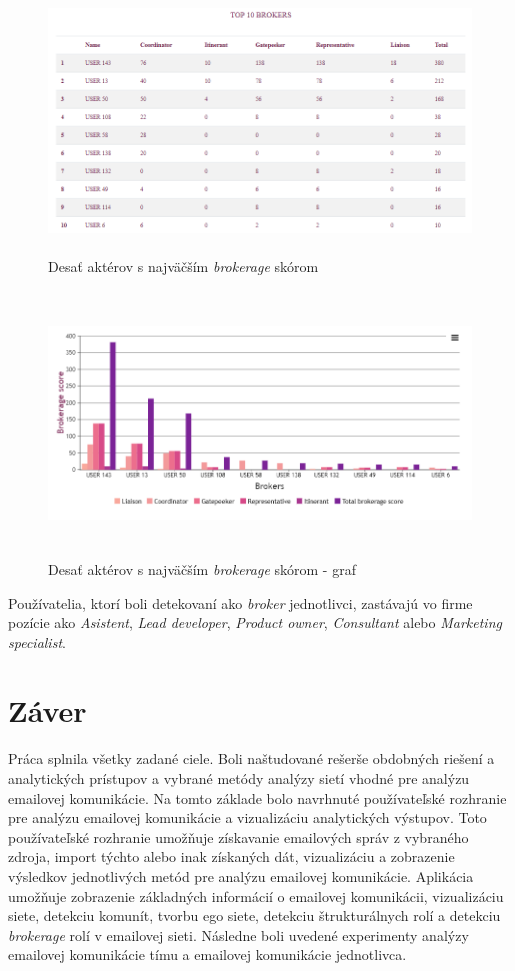 \documentclass[slovak,master,public,dept460,male,cpdeclaration,oneside]{diploma}
\begin{document}
\begin{figure}[H]
\centering
\includegraphics[width=12cm, height=7cm]{figures/analyza_jednotlivca_brokerage}
\caption{Desať aktérov s najväčším \textit{brokerage} skórom}
\label{analyza_jednotlivca_brokerage}
\end{figure}


\begin{figure}[H]
\centering
\includegraphics[width=13cm, height=7cm]{figures/analyza_jednotlivca_brokerage_graph}
\caption{Desať aktérov s najväčším \textit{brokerage} skórom - graf}
\label{analyza_jednotlivca_brokerage_graph}
\end{figure}

Používatelia, ktorí boli detekovaní ako \textit{broker} jednotlivci, zastávajú vo firme pozície ako \textit{Asistent}, \textit{Lead developer}, \textit{Product owner}, \textit{Consultant} alebo \textit{Marketing specialist}.

\section{Záver}
Práca splnila všetky zadané ciele. Boli naštudované rešerše obdobných riešení a analytických prístupov a vybrané metódy analýzy sietí vhodné pre analýzu emailovej komunikácie. Na tomto základe bolo navrhnuté používateľské rozhranie pre analýzu emailovej komunikácie a vizualizáciu analytických výstupov. Toto používateľské rozhranie umožňuje získavanie emailových správ z vybraného zdroja, import týchto alebo inak získaných dát, vizualizáciu a zobrazenie výsledkov jednotlivých metód pre analýzu emailovej komunikácie. Aplikácia umožňuje zobrazenie základných informácií o emailovej komunikácii, vizualizáciu siete, detekciu komunít, tvorbu ego siete, detekciu štrukturálnych rolí a detekciu \textit{brokerage} rolí v emailovej sieti. Následne boli uvedené experimenty analýzy emailovej komunikácie tímu a emailovej komunikácie jednotlivca.
\end{document}
